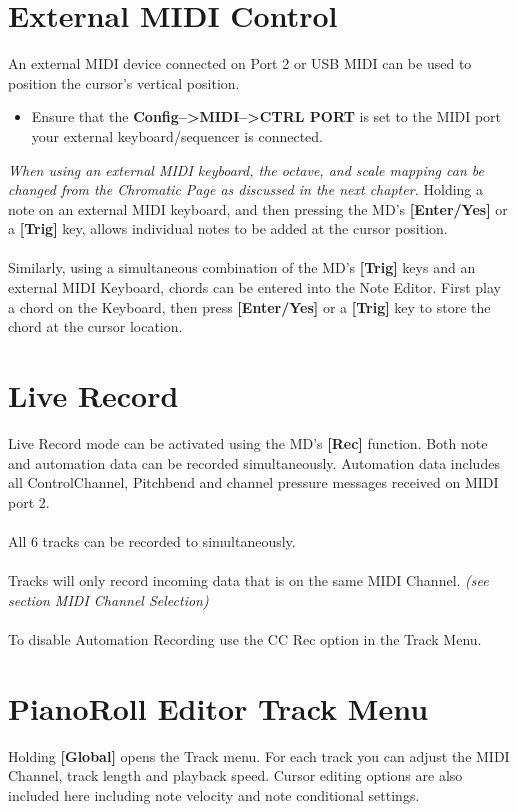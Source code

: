 \section{External MIDI Control}
An external MIDI device connected on Port 2 or USB MIDI can be used to position the cursor's vertical position.
\begin{itemize}
    \item Ensure that the \textbf{Config-->MIDI-->CTRL PORT} is set to the MIDI port your external keyboard/sequencer is connected.
\end{itemize}
\textit{When using an external MIDI keyboard, the octave, and scale mapping can be changed from the Chromatic Page as discussed in the next chapter.}
Holding a note on an external MIDI keyboard, and then pressing the MD's \textbf{[Enter/Yes]} or a \textbf{[Trig]} key, allows individual notes to  be added at the cursor position.
\\\\
Similarly, using a simultaneous combination of the MD's \textbf{[Trig]} keys and an external MIDI Keyboard, chords can be entered into the Note Editor. First play a chord on the Keyboard, then press \textbf{[Enter/Yes]} or a \textbf{[Trig]} key to store the chord at the cursor location.
\section{Live Record}
Live Record mode can be activated using the MD's \textbf{[Rec]} function. Both note and automation data can be recorded simultaneously. Automation data includes all ControlChannel, Pitchbend and channel pressure messages received on MIDI port 2.\\\\All 6 tracks can be recorded to simultaneously.\\
\\Tracks will only record incoming data that is on the same MIDI Channel. \textit{(see section MIDI Channel Selection)}\\\\
To disable Automation Recording use the CC Rec option in the Track Menu.
\section{PianoRoll Editor Track Menu}
Holding \textbf{[Global]} opens the Track menu. For each track you can adjust the MIDI Channel, track length and playback speed. Cursor editing options are also included here including note velocity and note conditional settings.

